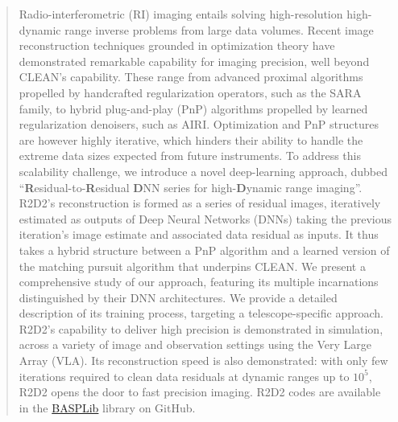 \documentclass[preprint2,twocolumn]{aastex631}
\begin{document}
\begin{abstract}
Radio-interferometric (RI) imaging entails solving high-resolution high-dynamic range inverse problems from large data volumes. Recent image reconstruction techniques grounded in optimization theory have demonstrated remarkable capability for imaging precision, well beyond CLEAN's capability. 
These range from advanced proximal algorithms propelled by handcrafted regularization operators, such as the SARA family, to hybrid plug-and-play (PnP) algorithms propelled by learned regularization denoisers, such as AIRI. Optimization and PnP structures are however highly iterative, which hinders their ability to handle the extreme data sizes expected from future instruments. To address this scalability challenge, we introduce a novel deep-learning approach, dubbed ``\textbf{R}esidual-to-\textbf{R}esidual \textbf{D}NN series for high-\textbf{D}ynamic range imaging''. R2D2's reconstruction is formed as a series of residual images, iteratively estimated as outputs of Deep Neural Networks (DNNs) taking the previous iteration's image estimate and associated data residual as inputs. It thus takes a hybrid structure between a PnP algorithm and a learned version of the matching pursuit algorithm that underpins CLEAN. We present a comprehensive study of our approach, featuring its multiple incarnations distinguished by their DNN architectures. We provide a detailed description of its training process, targeting a telescope-specific approach. R2D2's capability to deliver high precision is demonstrated in simulation, across a variety of image and observation settings using the Very Large Array (VLA). Its reconstruction speed is also demonstrated: with only few iterations required to clean data residuals at dynamic ranges up to $10^5$, R2D2 opens the door to fast precision imaging. R2D2 codes 
are available in the \href{https://basp-group.github.io/BASPLib/}{BASPLib}
library on GitHub.
\end{abstract}



\end{document}
